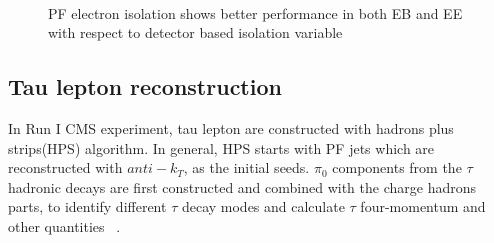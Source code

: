 \begin{figure}[!htbp] 
     \centering
     \\
     \caption{PF electron isolation shows better performance in both EB and EE with respect to detector based isolation variable~\cite{electron_reco2015}}
     \label{fig:eleIso}
\end{figure}




\subsection{Tau lepton reconstruction} \label{Chapter:taureco}

In Run I CMS experiment, tau lepton are constructed with hadrons plus strips(HPS) algorithm. In general, HPS starts with PF jets which are reconstructed with $anti-k_{T}$, as the initial seeds. $\pi_{0}$ components from the $\tau$ hadronic decays are first constructed and combined with the charge hadrons parts, to identify different $\tau$ decay modes and calculate $\tau$ four-momentum and other quantities ~\cite{TauIdentiRunI}. 


